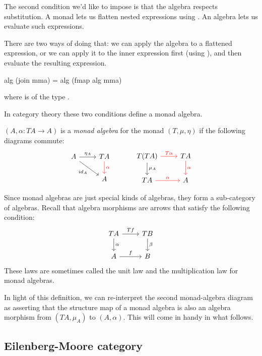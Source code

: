 \documentclass[DaoFP]{subfiles}
\begin{document}
The second condition we'd like to impose is that the algebra respects substitution. A monad lets us flatten nested expressions using . An algebra lets us evaluate such expressions. 

There are two ways of doing that: we can apply the algebra to a flattened expression, or we can apply it to the inner expression first (using ), and then evaluate the resulting expression. 
\begin{haskell}
 alg (join mma) = alg (fmap alg mma)
\end{haskell}
where  is of the type .

In category theory these two conditions define a monad algebra. 

$(A, \alpha \colon T A \to A)$ is a \emph{monad algebra} for the monad $(T, \mu, \eta)$ if the following diagrams commute:
\[
 \begin{tikzcd}
 A
 \arrow[r, "\eta_A"]
 \arrow[dr, "id_A"']
 & T A
 \arrow[d, red, "\alpha"]
 \\
 & A
 \end{tikzcd}
  \hspace{30pt}
 \begin{tikzcd}
T(T A) 
\arrow[r, red, "T \alpha "]
\arrow[d, "\mu_A"]
&TA
\arrow[d, red, "\alpha"]
\\
T A
\arrow[r, red, "\alpha"]
& A
 \end{tikzcd}
\]

Since monad algebras are just special kinds of algebras, they form a sub-category of algebras. Recall that algebra morphisms are arrows that satisfy the following condition:
\[
 \begin{tikzcd}
 T A 
 \arrow[r, "T f"]
 \arrow[d, "\alpha"]
 & T B
\arrow[d, "\beta"]
 \\
 A
 \arrow[r, "f"]
 & B
  \end{tikzcd}
\]
These laws are sometimes called the unit law and the multiplication law for monad algebras.

In light of this definition, we can re-interpret the second monad-algebra diagram as asserting that the structure map of a monad algebra is also an algebra morphism from $(T A, \mu_A)$ to $(A, \alpha)$. This will come in handy in what follows.

\subsection{Eilenberg-Moore category}
\end{document}
